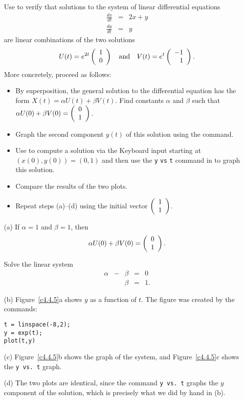 \documentclass{ximera}
\begin{document}
\begin{computerExercise} \label{c4.4.5}
Use \Matlab to verify that solutions to the system of linear differential
equations
\begin{eqnarray*}
\frac{dx}{dt} & = & 2x + y\\
\frac{dy}{dt} & = & y
\end{eqnarray*}
are linear combinations of the two solutions
\[
U(t) = e^{2t}\left(\begin{array}{r} 1 \\ 0\end{array}\right) \quad\mbox{and}\quad V(t) = e^{t}\left(\begin{array}{r} -1 \\ 1\end{array}\right).
\]
More concretely, proceed as follows:
\begin{itemize}
\item[(a)]  By superposition, the general solution to the differential
equation has the form $X(t)=\alpha U(t) + \beta V(t)$.  Find constants
$\alpha$ and $\beta$ such that $\alpha U(0) + \beta V(0) = \left(\begin{array}{r} 0 \\ 1\end{array}\right)$.
\item[(b)] Graph the second component $y(t)$ of this solution using the
 command.
\item[(c)] Use {\pplane} to compute a solution via the {\sf Keyboard
input} starting at $(x(0),y(0)) = (0,1)$ and then use the
{\tt y} {\tt vs} {\tt t} command in {\pplane} to graph this solution.
\item[(d)] Compare the results of the two plots.
\item[(e)]  Repeat steps (a)--(d) using the initial vector $\left(\begin{array}{r} 1 \\ 1\end{array}\right)$.
\end{itemize}

\begin{solution}

(a) \ans If $\alpha = 1$ and $\beta = 1$, then
\[
\alpha U(0) + \beta V(0) = \left(\begin{array}{r} 0 \\ 1\end{array}\right). 
\]

\soln Solve the linear system
\[
\begin{array}{rrrrl}
\alpha & - & \beta & = & 0 \\
& & \beta & = & 1. \end{array}
\]

(b) Figure~\ref{c4.4.5}a shows $y$ as a function of $t$.  The figure
was created by the \Matlab commands:
\begin{verbatim}
t = linspace(-8,2);
y = exp(t);
plot(t,y)
\end{verbatim}

(c) Figure~\ref{c4.4.5}b shows the {\pplane} graph of the system,
and Figure~\ref{c4.4.5}c shows the {\tt y vs.\ t} graph.

(d) The two plots are identical, since the {\pplane} command
{\tt y vs.\ t} graphs the $y$ component of the solution, which is
precisely what we did by hand in (b).


\end{solution}
\end{computerExercise}
\end{document}
